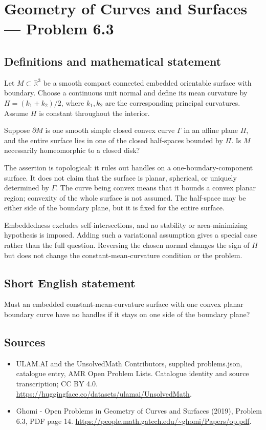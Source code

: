 \documentclass[11pt,a4paper]{article}
\begin{document}
\section*{Geometry of Curves and Surfaces — Problem 6.3}\label{statement}

\subsection{Definitions and mathematical statement}
Let $M\subset\mathbb R^3$ be a smooth compact connected embedded
orientable surface with boundary. Choose a continuous unit
normal and define its mean curvature by
$H=(k_1+k_2)/2$, where $k_1,k_2$ are the corresponding principal
curvatures. Assume $H$ is constant throughout the interior.

Suppose $\partial M$ is one smooth simple closed convex curve
$\Gamma$ in an affine plane $\Pi$, and the entire surface lies
in one of the closed half-spaces bounded by $\Pi$. Is $M$
necessarily homeomorphic to a closed disk?

The assertion is topological: it rules out handles on a
one-boundary-component surface. It does not claim that the
surface is planar, spherical, or uniquely determined by
$\Gamma$. The curve being convex means that it bounds a
convex planar region; convexity of the whole surface is not
assumed. The half-space may be either side of the boundary
plane, but it is fixed for the entire surface.

Embeddedness excludes self-intersections, and no stability or
area-minimizing hypothesis is imposed. Adding such a variational
assumption gives a special case rather than the full question.
Reversing the chosen normal changes the sign of $H$ but does
not change the constant-mean-curvature condition or the problem.
\subsection{Short English statement}
Must an embedded constant-mean-curvature surface with one convex
planar boundary curve have no handles if it stays on one side
of the boundary plane?
\subsection{Sources}
\begin{itemize}
\item[S1] ULAM.AI and the UnsolvedMath Contributors, supplied problems.json, catalogue entry, AMR Open Problem Lists. Catalogue identity and source transcription; CC BY 4.0.
\url{https://huggingface.co/datasets/ulamai/UnsolvedMath}.
\item[S2] Ghomi - Open Problems in Geometry of Curves and Surfaces (2019), Problem 6.3, PDF page 14. 
\url{https://people.math.gatech.edu/~ghomi/Papers/op.pdf}.
\end{itemize}
\end{document}
